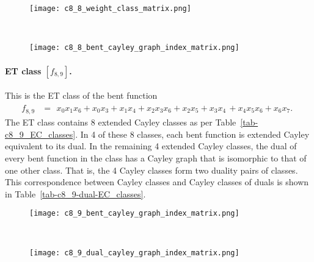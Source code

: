 \begin{figure}[!bhpt] %
\centering
\begin{minipage}{.48\textwidth}
  \centering
  \texttt{[image: c8\_8\_weight\_class\_matrix.png]}
  \label{fig:c8_8_weight_class_matrix}
\end{minipage}%
~~~~
\begin{minipage}{.48\textwidth}
  \centering
  \texttt{[image: c8\_8\_bent\_cayley\_graph\_index\_matrix.png]}
  \label{fig:c8_8_bent_cayley_graph_index_matrix}
\end{minipage}
\end{figure}

\newpage
\paragraph*{ET class $[f_{8,9}]$.}
%
%
This is the ET class of the bent function
\small{}
\begin{align*}
f_{ 8 , 9 } &=
\begin{array}{l}
x_{0} x_{1} x_{6} + x_{0} x_{3} + x_{1} x_{4} + x_{2} x_{3} x_{6} + x_{2} x_{5} + x_{3} x_{4}\, +
x_{4} x_{5} x_{6} + x_{6} x_{7}.
\end{array}
\end{align*}
\normalsize{}
The ET class contains 8 extended Cayley classes as per
Table~\ref{tab-c8_9_EC_classes}.
In 4 of these 8 classes, each bent function is extended Cayley equivalent to its dual.
In the remaining 4 extended Cayley classes, the dual of every bent function in the class has a Cayley graph
that is isomorphic to that of one other class. That is, the 4 Cayley classes form two duality pairs of classes.
This correspondence between Cayley classes and Cayley classes of duals is shown in Table~\ref{tab-c8_9-dual-EC_classes}.

\begin{figure}[!bhpt] %
\centering
\begin{minipage}{.48\textwidth}
  \centering
  \texttt{[image: c8\_9\_bent\_cayley\_graph\_index\_matrix.png]}
  \label{fig:c8_9_bent_cayley_graph_index_matrix}
\end{minipage}
~~
\begin{minipage}{.48\textwidth}
  \centering
  \texttt{[image: c8\_9\_dual\_cayley\_graph\_index\_matrix.png]}
  \label{fig:c8_9_dual_cayley_graph_index_matrix}
\end{minipage}%
\end{figure}

